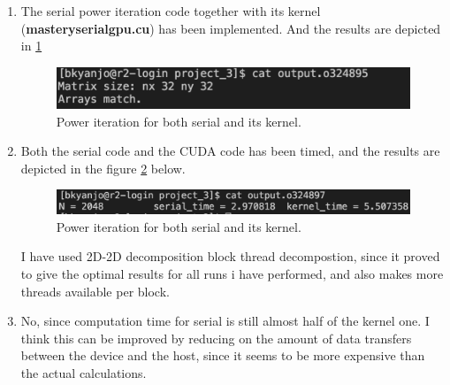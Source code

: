 \documentclass[12pt,a4paper]{article}
\begin{document}
\begin{enumerate}
	\item The serial power iteration code together with its kernel (\textbf{mastery\textunderscore serial\textunderscore gpu.cu}) has been implemented. And the results are depicted in \ref{fig:tm4}
	
	\begin{figure}[H]
		\centering
		\includegraphics[width=0.5\linewidth]{"tm4"}
		\caption{Power iteration for both serial and its kernel.}
		\label{fig:tm4}
	\end{figure}

	\item Both the serial code and the CUDA code has been timed, and the results are depicted in the figure \ref{fig:tm5} below.
	
	\begin{figure}[H]
		\centering
		\includegraphics[width=0.5\linewidth]{"tm5"}
		\caption{Power iteration for both serial and its kernel.}
		\label{fig:tm5}
	\end{figure}
	
	I have used 2D-2D decomposition block thread decompostion, since it proved to give the optimal results for all runs i have performed, and also makes more threads available per block.

	\item No,  since computation time for serial is still almost half of the kernel one. I think this can be improved by reducing on the amount of data transfers between the device and the host, since it seems to be more expensive than the actual calculations.

\end{enumerate}
	
\end{document}
